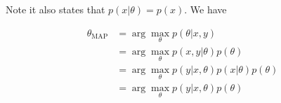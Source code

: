 \begin{answer}
Note it also states that $p(x|\theta) = p(x)$. We have

$$
    \begin{aligned}
        \theta_{\text{MAP}} &= \arg \max_{\theta}p(\theta| x, y)\\
        &= \arg \max_\theta p(x, y|\theta) p(\theta)\\
        &= \arg \max_\theta p(y|x, \theta) p(x|\theta)p(\theta) \\
        &= \arg \max_\theta p(y|x, \theta)p(\theta)
    \end{aligned}
$$

\end{answer}
